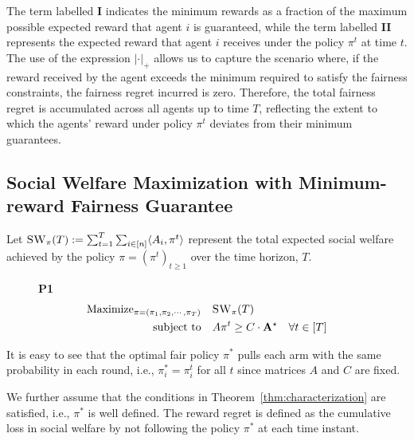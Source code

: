 The term labelled \textbf{I} indicates the minimum rewards as a fraction of the maximum possible expected reward that agent \(i\) is guaranteed, while the term labelled \textbf{II} represents the expected reward that agent \(i\) receives under the policy \(\pi^t\) at time \(t\). The use of the expression \( |\cdot|_+ \) allows us to capture the scenario where, if the reward received by the agent exceeds the minimum required to satisfy the fairness constraints, the fairness regret incurred is zero. Therefore, the total fairness regret is accumulated across all agents up to time \(T\), reflecting the extent to which the agents' reward under policy $\pi^t$ deviates from their minimum guarantees. 






\subsection{Social Welfare Maximization with Minimum-reward Fairness Guarantee}
\label{sec:regret}

Let $\textsc{SW}_{\pi}(T) := \sum_{t=1}^T \sum_{ i\in [n]} \langle A_i, \pi^t \rangle$ represent the total expected social welfare achieved by the policy $\pi = (\pi^t)_{t \geq 1}$ over the time horizon,  $T$. %
\begin{figure}[H]
    \centering
\textbf{P1}
\begin{align}
\text{Maximize}_{ \pi = (\pi_1, \pi_2, \cdots, \pi_T) } \quad & \textsc{SW}_\pi(T)  \label{eq:POne} \\
\text{subject to} \quad & A \pi^t  \geq C \cdot  \Amax \ \ \  \forall t \in [T] \nonumber 
\end{align}
\end{figure}
It is easy to see that the optimal fair policy $\pi^* $ pulls each arm with the same probability in each round, i.e., $\pi^*_i = \pi^t_i$ for all $t$ since  matrices $A$ and $C$ are fixed.  

We further assume that the conditions in Theorem~\ref{thm:characterization} are satisfied, i.e., $\pi^*$ is well defined. The reward regret is defined as the cumulative loss in social welfare by not following the policy  $\pi^*$ at each time instant. 


